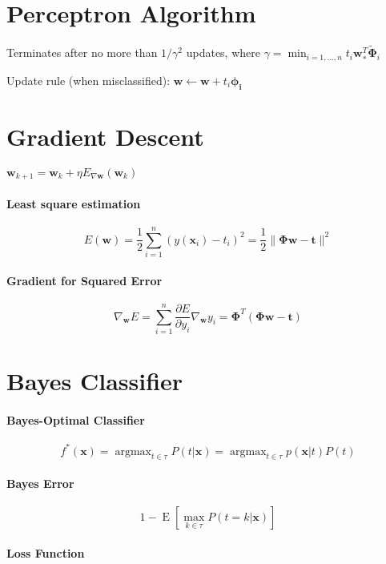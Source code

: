 \documentclass[9pt,fleqn]{scrartcl}
\DeclareMathOperator*{\argmax}{argmax}
\DeclareMathOperator{\E}{E}
\begin{document}
\begin{multicols}{4}
\section{Perceptron Algorithm}
Terminates after no more than $1/\gamma^2$ updates, where 
$\gamma = \min_{i=1,\dots,n} t_i\mathbf{w}_*^T\mathbf{\tilde
\Phi}_i$

Update rule (when misclassified): $\mathbf{w} \leftarrow \mathbf{w} +
t_i\mathbf{\phi_i}$

\section{Gradient Descent}
$\mathbf{w}_{k+1} = \mathbf{w}_k + \eta E_{\nabla \mathbf w}(\mathbf{w}_k)$
\paragraph{Least square estimation}
\[ E(\mathbf w) = \frac12 \sum_{i=1}^n(y(\mathbf x_i)-t_i)^2= \frac12
\|\mathbf\Phi\mathbf w- \mathbf t\|^2 \]
\paragraph{Gradient for Squared Error}
\[ \nabla_{\mathbf w}E= \sum_{i=1}^n\frac{\partial E}{\partial y_i}
\nabla_{\mathbf w}y_i = \mathbf\Phi^T(\mathbf \Phi \mathbf w - \mathbf
t) \]

\section{Bayes Classifier}
\paragraph{Bayes-Optimal Classifier}
\[ f^*(\mathbf x) = \argmax_{t \in \tau} P(t|\mathbf x) = \argmax_{t
  \in \tau} p(\mathbf x|t) P(t) \]
\paragraph{Bayes Error}
\[ 1 - \E \left [ \max_{k\in\tau} P(t = k | \mathbf x) \right ] \]
\paragraph{Loss Function}

\end{multicols}
\end{document}
